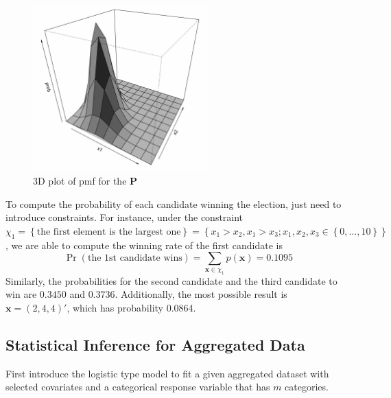 \documentclass[12pt]{article}
\newcommand{\Pmat}{\mathbf{P}}
\newcommand{\xvec}{\boldsymbol{x}}
\begin{document}
\begin{figure}%
\begin{center}
	\includegraphics[width=0.6\textwidth]{figures/3dplot.png}
	\caption{3D plot of pmf for the $\Pmat$ }
	\label{fig:3dplot}
\end{center}
\end{figure}




To compute the probability of each candidate winning the election, just need to introduce constraints. For instance, under the constraint $\chi_1 = \left\{\text{the first element is the largest one}\right\} = \left\{x_1>x_2, x_1>x_3; x_1, x_2,x_3 \in \left\{0,\dots,10\right\}\right\}$, we are able to compute the winning rate of the first candidate is
\begin{equation*}
\Pr(\text{the 1st candidate wins}) = \sum_{\xvec \in \chi_{1}} p(\xvec) = 0.1095
\end{equation*}
Similarly, the probabilities for the second candidate and the third candidate to win are $0.3450$ and $0.3736$. Additionally, the most possible result is $\xvec=(2,4,4)'$, which has probability 0.0864.




\subsection{Statistical Inference for Aggregated Data}\label{sec:model.est.inf}	
First introduce the logistic type model to fit a given aggregated dataset with selected covariates and a categorical response variable that has $m$ categories.
\end{document}
